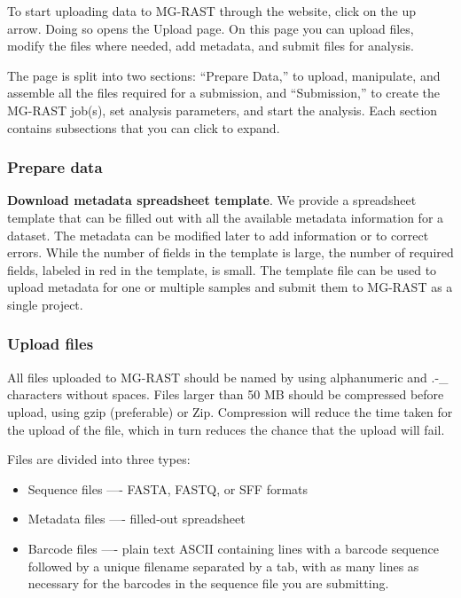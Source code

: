 \documentclass[12pt,fullpage]{report}
\begin{document}
To start uploading data to MG-RAST through the website, click on the up arrow. Doing so opens the Upload page.
On this page you can upload files, modify the files where needed, add metadata, and submit files for analysis.

The page is split into two sections: ``Prepare Data,'' to upload, manipulate, and assemble all the files required for a submission, and ``Submission,'' to create the MG-RAST job(s), set analysis parameters, and start the analysis. Each section contains subsections that you can click to expand.
\subsubsection{Prepare data}
{\bf Download metadata spreadsheet template}.
We provide a spreadsheet template that can be filled out with all the available metadata information for a dataset. The metadata can be modified later to add information or to correct errors. While the number of fields in the template is large, the number of required fields, labeled in red in the template, is small. The template file can be used to upload metadata for one or multiple samples and submit them to MG-RAST as a single project.

\subsubsection{Upload files}
All files uploaded to MG-RAST should be named by using alphanumeric and .-\_ characters without spaces. Files larger than 50 MB should be compressed before upload, using gzip (preferable) or Zip. Compression will reduce the time taken for the upload of the file, which in turn reduces the chance that the upload will fail.



Files are divided into three types: 
\begin{itemize}
\item
Sequence files —- FASTA, FASTQ, or SFF formats
\item
Metadata files —- filled-out spreadsheet
\item
Barcode files —- plain text ASCII containing lines with a barcode sequence followed by a unique filename separated by a tab, with as many lines as necessary for the barcodes in the sequence file you are submitting.
\end{itemize}
\end{document}

